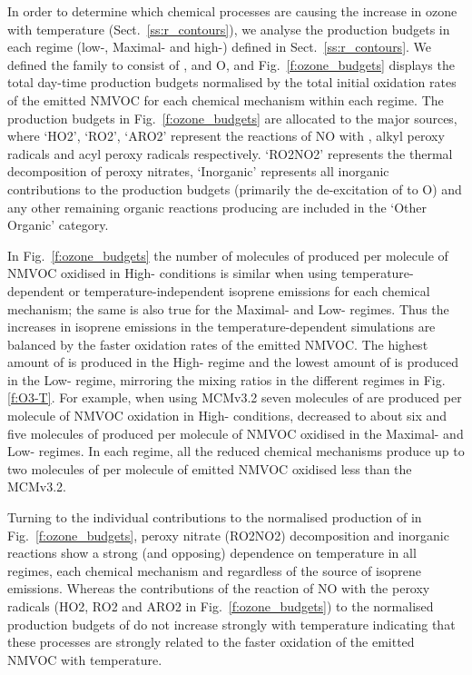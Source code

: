 In order to determine which chemical processes are causing the increase in ozone with temperature (Sect.~\ref{ss:r_contours}), we analyse the  production budgets in each  regime (low-, Maximal- and high-) defined in Sect.~\ref{ss:r_contours}.
We defined the  family to consist of ,  and O, and Fig.~\ref{f:ozone_budgets} displays the total day-time  production budgets normalised by the total initial oxidation rates of the emitted NMVOC for each chemical mechanism within each  regime.
The  production budgets in Fig.~\ref{f:ozone_budgets} are allocated to the major sources, where `HO2', `RO2', `ARO2' represent the reactions of NO with , alkyl peroxy radicals and acyl peroxy radicals respectively.
`RO2NO2' represents the thermal decomposition of peroxy nitrates, `Inorganic' represents all inorganic contributions to the  production budgets (primarily the de-excitation of  to O) and any other remaining organic reactions producing  are included in the `Other Organic' category.

In Fig.~\ref{f:ozone_budgets} the number of molecules of  produced per molecule of NMVOC oxidised in High- conditions is similar when using temperature-dependent or temperature-independent isoprene emissions for each chemical mechanism; the same is also true for the Maximal- and Low- regimes.
Thus the increases in isoprene emissions in the temperature-dependent simulations are balanced by the faster oxidation rates of the emitted NMVOC.
The highest amount of  is produced in the High- regime and the lowest amount of  is produced in the Low- regime, mirroring the  mixing ratios in the different  regimes in Fig.\ref{f:O3-T}.
For example, when using MCMv3.2 seven molecules of  are produced per molecule of NMVOC oxidation in High- conditions, decreased to about six and five molecules of  produced per molecule of NMVOC oxidised in the Maximal- and Low- regimes.
In each  regime, all the reduced chemical mechanisms produce up to two molecules of  per molecule of emitted NMVOC oxidised less than the MCMv3.2.

Turning to the individual contributions to the normalised production of  in Fig.~\ref{f:ozone_budgets}, peroxy nitrate (RO2NO2) decomposition and inorganic reactions show a strong (and opposing) dependence on temperature in all  regimes, each chemical mechanism and regardless of the source of isoprene emissions.
Whereas the contributions of the reaction of NO with the peroxy radicals (HO2, RO2 and ARO2 in Fig.~\ref{f:ozone_budgets}) to the normalised production budgets of  do not increase strongly with temperature indicating that these processes are strongly related to the faster oxidation of the emitted NMVOC with temperature.

